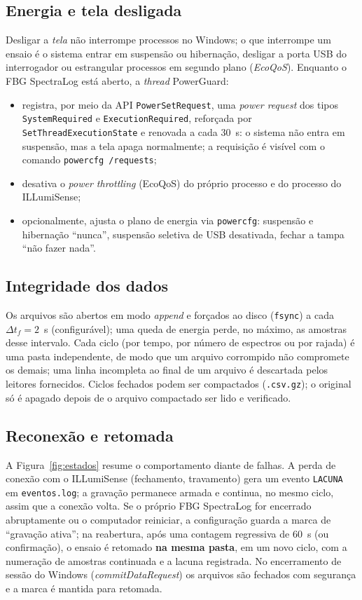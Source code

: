 \documentclass[11pt,a4paper]{article}
\begin{document}
\subsection{Energia e tela desligada}
Desligar a \emph{tela} não interrompe processos no Windows; o que interrompe um ensaio é o sistema
entrar em suspensão ou hibernação, desligar a porta USB do interrogador ou estrangular processos em
segundo plano (\emph{EcoQoS}). Enquanto o FBG SpectraLog está aberto, a \emph{thread} PowerGuard:
\begin{itemize}
\item registra, por meio da API \texttt{PowerSetRequest}, uma \emph{power request} dos tipos
  \texttt{SystemRequired} e \texttt{ExecutionRequired}, reforçada por \texttt{SetThreadExecutionState}
  e renovada a cada 30~s: o sistema não entra em suspensão, mas a tela apaga normalmente; a requisição
  é visível com o comando \texttt{powercfg /requests};
\item desativa o \emph{power throttling} (EcoQoS) do próprio processo e do processo do ILLumiSense;
\item opcionalmente, ajusta o plano de energia via \texttt{powercfg}: suspensão e hibernação
  ``nunca'', suspensão seletiva de USB desativada, fechar a tampa ``não fazer nada''.
\end{itemize}

\subsection{Integridade dos dados}
Os arquivos são abertos em modo \emph{append} e forçados ao disco (\texttt{fsync}) a cada
$\Delta t_f = 2$~s (configurável); uma queda de energia perde, no máximo, as amostras desse intervalo.
Cada ciclo (por tempo, por número de espectros ou por rajada) é uma pasta independente, de modo que um
arquivo corrompido não compromete os demais; uma linha incompleta ao final de um arquivo é descartada
pelos leitores fornecidos. Ciclos fechados podem ser compactados (\texttt{.csv.gz}); o original só é
apagado depois de o arquivo compactado ser lido e verificado.

\subsection{Reconexão e retomada}
A Figura~\ref{fig:estados} resume o comportamento diante de falhas. A perda de conexão com o
ILLumiSense (fechamento, travamento) gera um evento \texttt{LACUNA} em \texttt{eventos.log}; a
gravação permanece armada e continua, no mesmo ciclo, assim que a conexão volta. Se o próprio
FBG SpectraLog for encerrado abruptamente ou o computador reiniciar, a configuração guarda a marca de
``gravação ativa''; na reabertura, após uma contagem regressiva de 60~s (ou confirmação), o ensaio é
retomado \textbf{na mesma pasta}, em um novo ciclo, com a numeração de amostras continuada e a lacuna
registrada. No encerramento de sessão do Windows (\emph{commitDataRequest}) os arquivos são fechados
com segurança e a marca é mantida para retomada.
\end{document}
